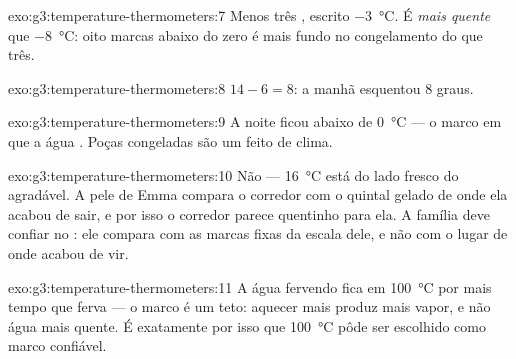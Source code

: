 \begin{solution}{exo:g3:temperature-thermometers:7}
Menos três , escrito \qty{-3}{\celsius}. É \emph{mais
quente} que \qty{-8}{\celsius}: oito marcas abaixo do zero é mais
fundo no congelamento do que três.
\end{solution}

\begin{solution}{exo:g3:temperature-thermometers:8}
$14 - 6 = 8$: a manhã esquentou $8$ graus.
\end{solution}

\begin{solution}{exo:g3:temperature-thermometers:9}
A noite ficou abaixo de \qty{0}{\celsius} --- o marco em que a água
. Poças congeladas são um  feito de clima.
\end{solution}

\begin{solution}{exo:g3:temperature-thermometers:10}
Não --- \qty{16}{\celsius} está do lado fresco do agradável. A pele
de Emma compara o corredor com o quintal gelado de onde ela acabou de
sair, e por isso o corredor parece quentinho para ela. A família deve
confiar no : ele compara com as marcas fixas da escala
dele, e não com o lugar de onde acabou de vir.
\end{solution}

\begin{solution}{exo:g3:temperature-thermometers:11}
A água fervendo fica em \qty{100}{\celsius} por mais tempo que ferva
--- o marco é um teto: aquecer mais produz mais vapor, e não água
mais quente. É exatamente por isso que \qty{100}{\celsius} pôde ser
escolhido como marco confiável.
\end{solution}
